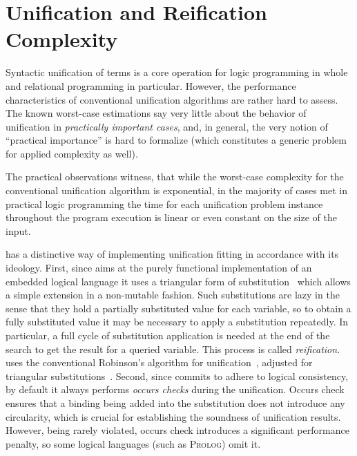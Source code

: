 \section{Unification and Reification Complexity}
\label{sec:uni-rei}

Syntactic unification of terms is a core operation for logic programming in whole and relational programming in particular.
However, the performance characteristics of conventional unification algorithms are rather hard to assess.
The known worst-case estimations say very little about the behavior of unification in \emph{practically important cases}, and, in
general, the very notion of ``practical importance'' is hard to formalize (which constitutes a generic problem for applied complexity as well).

The practical observations witness, that while the worst-case complexity for the conventional unification algorithm is exponential, in the majority of
cases met in practical logic programming the time for each unification problem instance throughout the program execution is linear or even constant on the size of the input.


\mK has a distinctive way of implementing unification fitting in accordance with its ideology. First, since \mK aims at the purely functional implementation of an embedded logical
language it uses a triangular form of substitution~\cite{UnificationTheory} which allows a simple extension in a non-mutable fashion. Such substitutions are lazy in the sense that
they hold a partially substituted value for each variable, so to obtain a fully substituted value it may be necessary to apply a substitution repeatedly. In particular, a full
cycle of substitution application is needed at the end of the search to get the result for a queried variable. This process is called \emph{reification}. \mK uses the conventional Robinson's
algorithm for unification~\cite{RobinsonsAlgorithm}, adjusted for triangular substitutions~\cite{TRS}. Second, since \mK commits to adhere to logical consistency, by default it always
performs \emph{occurs checks} during the unification. Occurs check ensures that a binding being added into the substitution does not introduce any circularity, which is crucial for
establishing the soundness of unification results. However, being rarely violated, occurs check introduces a significant performance penalty, so some logical languages (such as \textsc{Prolog})
omit it.

